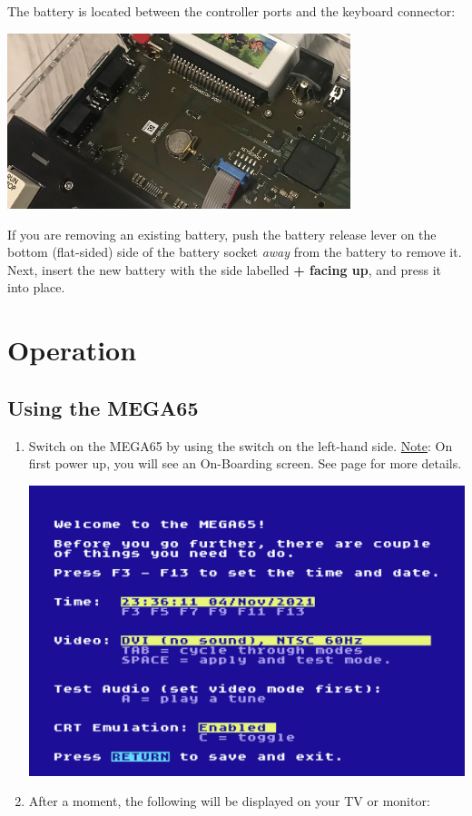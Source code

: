 The battery is located between the controller ports and the keyboard connector:

\includegraphics[width=10cm]{images/rtc-battery-location}

If you are removing an existing battery, push the battery release lever on the bottom (flat-sided) side of the
battery socket \textit{away} from the battery to remove it. Next, insert the new battery with the side labelled
{\bf + facing up}, and press it into place.




\section{Operation}

\subsection{Using the MEGA65}

\begin{enumerate}
	\item Switch on the MEGA65 by using the switch on the left-hand side. \newline \newline
    \underline{Note}: On first power up, you will see an On-Boarding screen. See page \pageref{onboarding} for more details. \newline
    \begin{center}%
      \includegraphics[trim= 10mm 140mm 10mm 10mm,clip,width=0.9\linewidth]{images/img011_final_boot_01.png}%
    \end{center}
	\item After a moment, the following will be displayed on your TV or monitor:
\end{enumerate}

